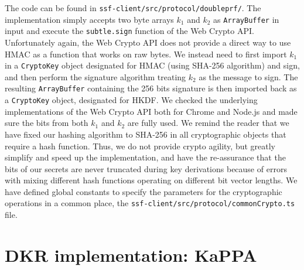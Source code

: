 The code can be found in {\texttt{ssf-client/src/protocol/doubleprf/}}.
The implementation simply accepts two byte arrays $k_1$ and $k_2$ 
as \texttt{ArrayBuffer} in input and execute the {\texttt{subtle.sign}} 
function of the Web Crypto API. 
Unfortunately again, the Web Crypto API does not provide a direct way to
use HMAC as a function that works on raw bytes. We instead
need to first import $k_1$ in a \texttt{CryptoKey} object
designated for HMAC (using SHA-256 algorithm) and sign, 
and then perform the signature
algorithm treating $k_2$ as the message to sign.
The resulting \texttt{ArrayBuffer} containing the
256 bits signature is then imported back as
a \texttt{CryptoKey} object, designated for HKDF.
We checked the underlying implementations of the Web Crypto API
both for Chrome and Node.js and made sure the bits
from both $k_1$ and $k_2$ are fully used. We remind the
reader that we have fixed our
hashing algorithm to SHA-256 in all cryptographic
objects that require a hash function. Thus, we do not provide
crypto agility, but greatly simplify and speed up the 
implementation, and have the re-assurance that the bits
of our secrets are never truncated during key derivations
because of errors with mixing different hash functions
operating on different bit vector lengths. 
We have defined global constants to specify the parameters
for the cryptographic operations in a common place,
the \texttt{ssf-client/src/protocol/commonCrypto.ts} file.

\section{DKR implementation: KaPPA}\label{sc:DKR-implementation}

